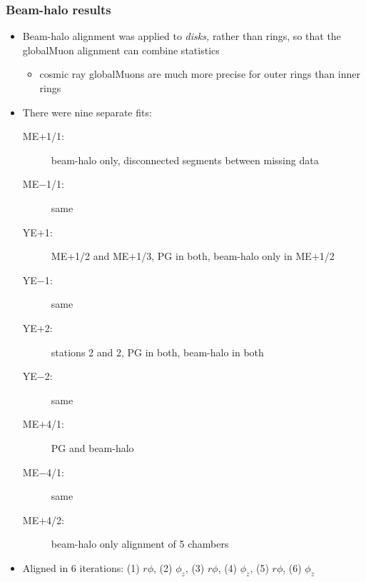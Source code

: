 \documentclass[compress]{beamer}
\begin{document}
\begin{frame}
\frametitle{Beam-halo results}

\begin{itemize}
\item Beam-halo alignment was applied to {\it disks,} rather than
  rings, so that the globalMuon alignment can combine statistics
\begin{itemize}
\item cosmic ray globalMuons are much more precise for outer rings than inner rings
\end{itemize}
\item There were nine separate fits:
\begin{description}
\item[ME$+$1/1:] beam-halo only, disconnected segments between missing data
\item[ME$-$1/1:] same
\item[YE$+$1:] ME$+$1/2 and ME$+$1/3, PG in both, beam-halo only in ME$+$1/2
\item[YE$-$1:] same
\item[YE$+$2:] stations 2 and 2, PG in both, beam-halo in both
\item[YE$-$2:] same
\item[ME$+$4/1:] PG and beam-halo
\item[ME$-$4/1:] same
\item[ME$+$4/2:] beam-halo only alignment of 5 chambers
\end{description}

\item Aligned in 6 iterations: (1) $r\phi$, (2) $\phi_z$, (3) $r\phi$, (4) $\phi_z$, (5) $r\phi$, (6) $\phi_z$
\end{itemize}
\end{frame}
\end{document}
